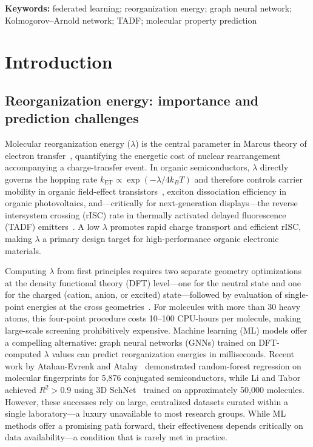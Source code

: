 \documentclass[twocolumn]{article}
\newcommand{\lam}{\lambda}
\newcommand{\Rsq}{R^{2}}
\begin{document}
\textbf{Keywords:} federated learning; reorganization energy; graph neural network; Kolmogorov--Arnold network; TADF; molecular property prediction

\section{Introduction}\label{sec:intro}

\subsection*{Reorganization energy: importance and prediction challenges}

Molecular reorganization energy ($\lam$) is the central parameter in Marcus theory of electron transfer~\cite{Marcus1993}, quantifying the energetic cost of nuclear rearrangement accompanying a charge-transfer event.
In organic semiconductors, $\lam$ directly governs the hopping rate $k_{\text{ET}} \propto \exp(-\lam / 4k_BT)$ and therefore controls carrier mobility in organic field-effect transistors~\cite{Coropceanu2007}, exciton dissociation efficiency in organic photovoltaics, and---critically for next-generation displays---the reverse intersystem crossing (rISC) rate in thermally activated delayed fluorescence (TADF) emitters~\cite{Uoyama2012_TADF}.
A low $\lam$ promotes rapid charge transport and efficient rISC, making $\lam$ a primary design target for high-performance organic electronic materials.

Computing $\lam$ from first principles requires two separate geometry optimizations at the density functional theory (DFT) level---one for the neutral state and one for the charged (cation, anion, or excited) state---followed by evaluation of single-point energies at the cross geometries~\cite{Nelsen1987}.
For molecules with more than 30 heavy atoms, this four-point procedure costs 10--100 CPU-hours per molecule, making large-scale screening prohibitively expensive.
Machine learning (ML) models offer a compelling alternative: graph neural networks (GNNs) trained on DFT-computed $\lam$ values can predict reorganization energies in milliseconds.
Recent work by Atahan-Evrenk and Atalay~\cite{AtahanEvrenk2019_RE} demonstrated random-forest regression on molecular fingerprints for 5{,}876 conjugated semiconductors, while Li and Tabor~\cite{Li2023_SchNet} achieved $\Rsq > 0.9$ using 3D SchNet~\cite{Schutt2018_SchNet} trained on approximately 50{,}000 molecules.
However, these successes rely on large, centralized datasets curated within a single laboratory---a luxury unavailable to most research groups.
While ML methods offer a promising path forward, their effectiveness depends critically on data availability---a condition that is rarely met in practice.
\end{document}
